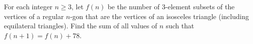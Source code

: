 For each integer $n\ge 3$, let $f(n)$ be the number of 3-element subsets of the vertices of a regular $n$-gon that are the vertices of an isosceles triangle (including equilateral triangles). Find the sum of all values of $n$ such that $f(n+1)=f(n)+78$.